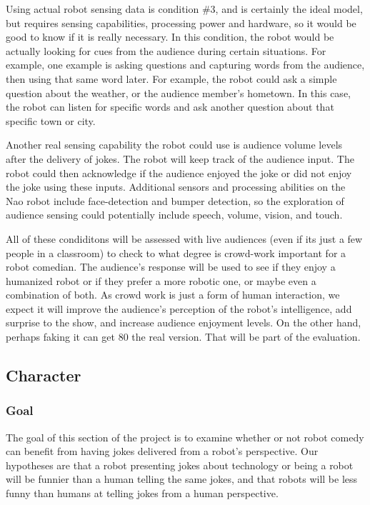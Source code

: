 \documentclass[onecolumn, draftclsnofoot,10pt, compsoc]{IEEEtran}
\begin{document}
Using actual robot sensing data is condition \#3, and is certainly the ideal model, but requires sensing capabilities,
processing power and hardware, so it would be good to know if it is really necessary. In this condition, the robot would
be actually looking for cues from the audience during certain situations. For example, one example is asking questions
and capturing words from the audience, then using that same word later. For example, the robot could ask a simple
question about the weather, or the audience member’s hometown. In this case, the robot can listen for specific words
and ask another question about that specific town or city.

Another real sensing capability the robot could use is audience volume levels after the delivery of jokes. The robot
will keep track of the audience input. The robot could then acknowledge if the audience enjoyed the joke or did not
enjoy the joke using these inputs. Additional sensors and processing abilities on the Nao robot include face-detection
and bumper detection, so the exploration of audience sensing could potentially include speech, volume, vision, and
touch.

All of these condiditons will be assessed with live audiences (even if its just a few people in a classroom) to check to
what degree is crowd-work important for a robot comedian. The audience’s response will be used to see if they enjoy
a humanized robot or if they prefer a more robotic one, or maybe even a combination of both. As crowd work is just a
form of human interaction, we expect it will improve the audience’s perception of the robot’s intelligence, add surprise
to the show, and increase audience enjoyment levels. On the other hand, perhaps faking it can get 80%
the real version. That will be part of the evaluation.



\subsection{Character}
\subsubsection{Goal}
The goal of this section of the project is to examine whether or not robot comedy can benefit from having jokes delivered
from a robot’s perspective. Our hypotheses are that a robot presenting jokes about technology or being a robot will be
funnier than a human telling the same jokes, and that robots will be less funny than humans at telling jokes from a
human perspective.
\end{document}
